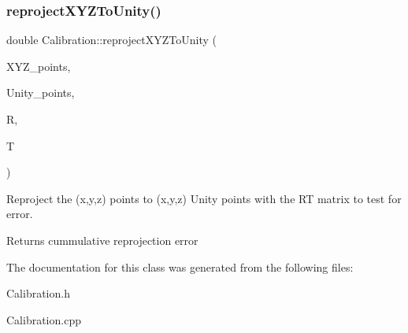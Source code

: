 \subsubsection{\texorpdfstring{reproject\+X\+Y\+Z\+To\+Unity()}{reprojectXYZToUnity()}}
{\footnotesize\ttfamily double Calibration\+::reproject\+X\+Y\+Z\+To\+Unity (\begin{DoxyParamCaption}\item[{std\+::vector$<$ std\+::vector$<$ cv\+::\+Point3f $>$$>$}]{X\+Y\+Z\+\_\+points,  }\item[{std\+::vector$<$ std\+::vector$<$ cv\+::\+Point3f $>$$>$}]{Unity\+\_\+points,  }\item[{Eigen\+::\+Matrix\+Xf}]{R,  }\item[{Eigen\+::\+Matrix\+Xf}]{T }\end{DoxyParamCaption})\hspace{0.3cm}{\ttfamily [static]}}



Reproject the (x,y,z) points to (x\textquotesingle{},y\textquotesingle{},z\textquotesingle{}) Unity points with the RT matrix to test for error. 

\begin{DoxyReturn}{Returns}
cummulative reprojection error 
\end{DoxyReturn}


The documentation for this class was generated from the following files\+:\begin{DoxyCompactItemize}
\item 
Calibration.\+h\item 
Calibration.\+cpp\end{DoxyCompactItemize}
